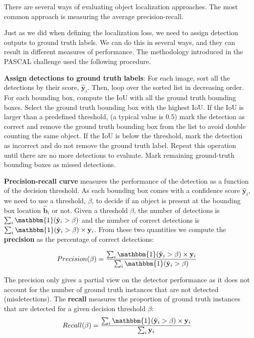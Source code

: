 There are several ways of evaluating object localization approaches. The most common approach is measuring the average precision-recall. 

Just as we did when defining the localization loss, we need to assign detection outputs to ground truth labels. We can do this in several ways, and they can result in different measures of performance. The methodology introduced in the PASCAL challenge used the following procedure. 

{\bf Assign detections to ground truth labels}: For each image, sort all the detections by their score, $\hat{\mathbf{y}}_i$. Then, loop over the sorted list in decreasing order. For each bounding box, compute the IoU with all the ground truth bounding boxes. Select the ground truth bounding box with the highest IoU. If the IoU is larger than a predefined threshold, (a typical value is 0.5) mark the detection as correct and remove the ground truth bounding box from the list to avoid double counting the same object. If the IoU is below the threshold, mark the detection as incorrect and do not remove the ground truth label. Repeat this operation until there are no more detections to evaluate. Mark remaining ground-truth bounding boxes as missed detections. 

{\bf Precision-recall curve}
measures the performance of the detection as a function of the decision threshold. As each bounding box comes with a confidence score $\hat{\mathbf{y}}_i$, we need to use a threshold, $\beta$, to decide if an object is present at the bounding box location $\hat{\mathbf{b}}_i$ or not. Given a threshold $\beta$, the number of detections is $\sum_i  \mathbbm{1} (\hat{\mathbf{y}}_i > \beta)$ and the number of correct detections is $\sum_i  \mathbbm{1} (\hat{\mathbf{y}}_i > \beta) \times \mathbf{y}_i$. From these two quantities we compute the {\bf precision} as the percentage of correct detections:


\begin{equation}
Precision(\beta) = \frac{\sum_i  \mathbbm{1} (\hat{\mathbf{y}}_i > \beta) \times \mathbf{y}_i} {\sum_i  \mathbbm{1} (\hat{\mathbf{y}}_i > \beta)}
\end{equation}

The precision only gives a partial view on the detector performance as it does not account for the number of ground truth instances that are not detected (misdetections). The {\bf recall} measures the proportion of ground truth instances that are detected for a given decision threshold $\beta$:
\begin{equation}
Recall (\beta) = \frac{\sum_i  \mathbbm{1} (\hat{\mathbf{y}}_i > \beta) \times \mathbf{y}_i} {\sum_i \mathbf{y}_i}
\end{equation}

